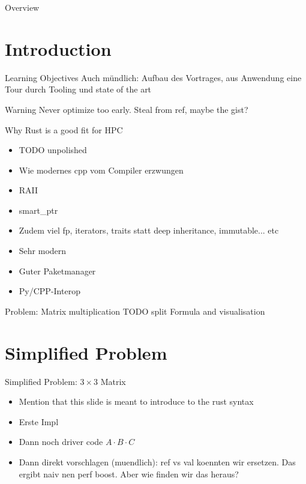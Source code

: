 \documentclass[compress,aspectratio=169]{beamer}
\begin{document}
\begin{frame}[plain]
	\titlepage
\end{frame}

\begin{frame}{Overview}
\tableofcontents
\end{frame}

\section{Introduction}

\begin{frame}{Learning Objectives}
  Auch m\"undlich: Aufbau des Vortrages, aus Anwendung eine Tour durch Tooling und state of the art
\end{frame}

\begin{frame}{Warning}
  Never optimize too early. Steal from ref, maybe the gist?
\end{frame}

\begin{frame}{Why Rust is a good fit for HPC}
  \begin{itemize}
    \item TODO unpolished
    \item Wie modernes cpp vom Compiler erzwungen
    \item RAII
    \item smart\_ptr
    \item Zudem viel fp, iterators, traits statt deep inheritance, immutable... etc
    \item Sehr modern
    \item Guter Paketmanager
    \item Py/CPP-Interop
  \end{itemize}
\end{frame}

\begin{frame}{Problem: Matrix multiplication}
  TODO split Formula and visualisation
\end{frame}

\section{Simplified Problem}

\begin{frame}{Simplified Problem: $3 \times 3$ Matrix}
  \begin{itemize}
    \item Mention that this slide is meant to introduce to the rust syntax
    \item Erste Impl
    \item Dann noch driver code $A \cdot B \cdot C$
    \item Dann direkt vorschlagen (muendlich): ref vs val koennten wir ersetzen. Das ergibt naiv nen perf boost. Aber wie finden wir das heraus?
  \end{itemize}
\end{frame}
\end{document}
